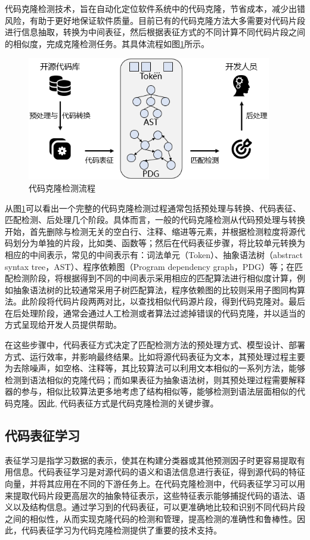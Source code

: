代码克隆检测技术，旨在自动化定位软件系统中的代码克隆，节省成本，减少出错风险，有助于更好地保证软件质量。目前已有的代码克隆方法大多需要对代码片段进行信息抽取，转换为中间表征，然后根据表征方式的不同计算不同代码片段之间的相似度，完成克隆检测任务。其具体流程如图\ref{fig:figure1}所示。
\begin{figure}[H]
    \centering
    \includegraphics[width=0.95\textwidth]{figures/figure1}
    \caption{代码克隆检测流程}\label{fig:figure1}
\end{figure}

从图\ref{fig:figure1}可以看出一个完整的代码克隆检测过程通常包括预处理与转换、代码表征、匹配检测、后处理几个阶段。具体而言，一般的代码克隆检测从代码预处理与转换开始，首先删除与检测无关的空白行、注释、缩进等元素，并根据检测粒度将源代码划分为单独的片段，比如类、函数等；然后在代码表征步骤，将比较单元转换为相应的中间表示，常见的中间表示有：词法单元（Token）、抽象语法树（abstract syntax tree，AST）、程序依赖图（Program dependency graph，PDG）等；在匹配检测阶段，将根据得到不同的中间表示采用相应的匹配算法进行相似度计算，例如抽象语法树的比较通常采用子树匹配算法，程序依赖图的比较则采用子图同构算法。此阶段将代码片段两两对比，以查找相似代码源片段，得到代码克隆对。最后在后处理阶段，通常会通过人工检测或者算法过滤掉错误的代码克隆，并以适当的方式呈现给开发人员提供帮助。

在这些步骤中，代码表征方式决定了匹配检测方法的预处理方式、模型设计、部署方式、运行效率，并影响最终结果\cite{陈秋远2019代码克隆检测研究进展}。比如将源代码表征为文本，其预处理过程主要为去除噪声，如空格、注释等，其比较算法可以利用文本相似的一系列方法，能够检测到语法相似的克隆代码；而如果表征为抽象语法树，则其预处理过程需要解释器的参与，相似比较算法更多地考虑了结构相似等，能够检测到语法层面相似的代码克隆。因此, 代码表征方式是代码克隆检测的关键步骤。


\subsection{代码表征学习}
\label{subsec:Code representation}
表征学习是指学习数据的表示，使其在构建分类器或其他预测因子时更容易提取有用信息\cite{Bengio2013Representation}。代码表征学习是对源代码的语义和语法信息进行表征，得到源代码的特征向量，并将其应用在不同的下游任务上。在代码克隆检测中，代码表征学习可以用来提取代码片段更高层次的抽象特征表示，这些特征表示能够捕捉代码的语法、语义以及结构信息。通过学习到的代码表征，可以更准确地比较和识别不同代码片段之间的相似性，从而实现克隆代码的检测和管理，提高检测的准确性和鲁棒性。因此，代码表征学习为代码克隆检测提供了重要的技术支持。


